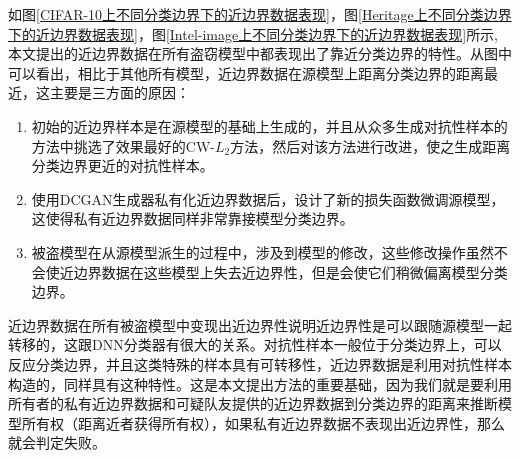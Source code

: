 
如图\ref{CIFAR-10上不同分类边界下的近边界数据表现}，图\ref{Heritage上不同分类边界下的近边界数据表现}，图\ref{Intel-image上不同分类边界下的近边界数据表现}所示, 本文提出的近边界数据在所有盗窃模型中都表现出了靠近分类边界的特性。从图中可以看出，相比于其他所有模型，近边界数据在源模型上距离分类边界的距离最近，这主要是三方面的原因：

\begin{enumerate}
	\renewcommand{\labelenumi}{\theenumi)}
	\item 初始的近边界样本是在源模型的基础上生成的，并且从众多生成对抗性样本的方法中挑选了效果最好的CW-$L_2$方法，然后对该方法进行改进，使之生成距离分类边界更近的对抗性样本。
	\item 使用DCGAN生成器私有化近边界数据后，设计了新的损失函数微调源模型，这使得私有近边界数据同样非常靠接模型分类边界。
	\item 被盗模型在从源模型派生的过程中，涉及到模型的修改，这些修改操作虽然不会使近边界数据在这些模型上失去近边界性，但是会使它们稍微偏离模型分类边界。
\end{enumerate}

近边界数据在所有被盗模型中变现出近边界性说明近边界性是可以跟随源模型一起转移的，这跟DNN分类器有很大的关系。对抗性样本一般位于分类边界上，可以反应分类边界，并且这类特殊的样本具有可转移性，近边界数据是利用对抗性样本构造的，同样具有这种特性。这是本文提出方法的重要基础，因为我们就是要利用所有者的私有近边界数据和可疑队友提供的近边界数据到分类边界的距离来推断模型所有权（距离近者获得所有权），如果私有近边界数据不表现出近边界性，那么就会判定失败。

